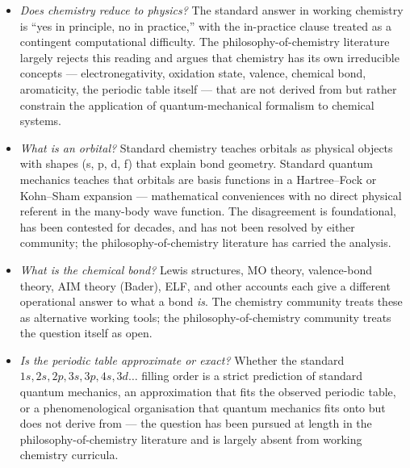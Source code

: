 \begin{itemize}
\item \emph{Does chemistry reduce to physics?} The standard answer in working chemistry is ``yes in principle, no in practice,'' with the in-practice clause treated as a contingent computational difficulty. The philosophy-of-chemistry literature largely rejects this reading and argues that chemistry has its own irreducible concepts --- electronegativity, oxidation state, valence, chemical bond, aromaticity, the periodic table itself --- that are not derived from but rather constrain the application of quantum-mechanical formalism to chemical systems.
\item \emph{What is an orbital?} Standard chemistry teaches orbitals as physical objects with shapes (s, p, d, f) that explain bond geometry. Standard quantum mechanics teaches that orbitals are basis functions in a Hartree--Fock or Kohn--Sham expansion --- mathematical conveniences with no direct physical referent in the many-body wave function. The disagreement is foundational, has been contested for decades, and has not been resolved by either community; the philosophy-of-chemistry literature has carried the analysis.
\item \emph{What is the chemical bond?} Lewis structures, MO theory, valence-bond theory, AIM theory (Bader), ELF, and other accounts each give a different operational answer to what a bond \emph{is}. The chemistry community treats these as alternative working tools; the philosophy-of-chemistry community treats the question itself as open.
\item \emph{Is the periodic table approximate or exact?} Whether the standard $1s, 2s, 2p, 3s, 3p, 4s, 3d \ldots$ filling order is a strict prediction of standard quantum mechanics, an approximation that fits the observed periodic table, or a phenomenological organisation that quantum mechanics fits onto but does not derive from --- the question has been pursued at length in the philosophy-of-chemistry literature and is largely absent from working chemistry curricula.
\end{itemize}

